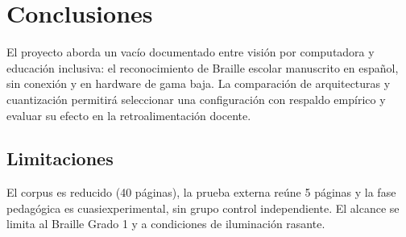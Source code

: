 \section{Conclusiones}

El proyecto aborda un vacío documentado entre visión por computadora y educación
inclusiva: el reconocimiento de Braille escolar manuscrito en español, sin
conexión y en hardware de gama baja. La comparación de arquitecturas y
cuantización permitirá seleccionar una configuración con respaldo empírico y
evaluar su efecto en la retroalimentación docente.

\subsection{Limitaciones}
El corpus es reducido (40 páginas), la prueba externa reúne 5 páginas y la fase
pedagógica es cuasiexperimental, sin grupo control independiente. El alcance se
limita al Braille Grado 1 y a condiciones de iluminación rasante.
